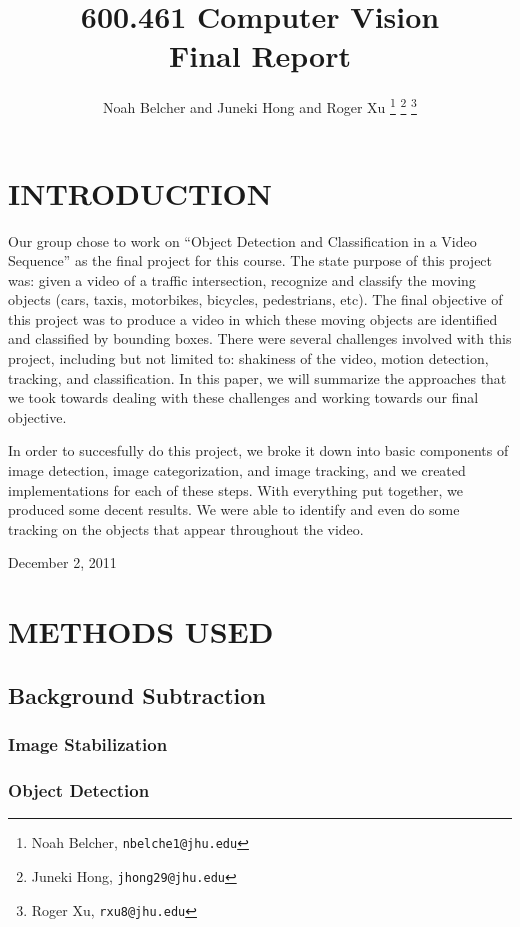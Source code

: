 \documentclass[a4paper, 10pt, conference]{ieeeconf}      %
\title{\LARGE \bf
600.461 Computer Vision\\Final Report
}
\author{Noah Belcher and Juneki Hong and Roger Xu%
\thanks{Noah Belcher,
        {\tt\small nbelche1@jhu.edu}}%
\thanks{Juneki Hong,
        {\tt\small jhong29@jhu.edu}}%
\thanks{Roger Xu,
		{\tt\small rxu8@jhu.edu}}%
}
\begin{document}
\maketitle
\thispagestyle{empty}
\pagestyle{empty}


\section{INTRODUCTION}

Our group chose to work on “Object Detection and Classification in a Video Sequence” as the final project for this course. The state purpose of this project was: given a video of a traffic intersection, recognize and classify the moving objects (cars, taxis, motorbikes, bicycles, pedestrians, etc). The final objective of this project was to produce a video in which these moving objects are identified and classified by bounding boxes. There were several challenges involved with this project, including but not limited to: shakiness of the video, motion detection, tracking, and classification. In this paper, we will summarize the approaches that we took towards dealing with these challenges and working towards our final objective. \newline


In order to succesfully do this project, we broke it down into basic components of image detection, image categorization, and image tracking, and we created implementations for each of these steps. With everything put together, we produced some decent results. We were able to identify and even do some tracking on the objects that appear throughout the video. 


\hfill December 2, 2011


\section{METHODS USED}

\subsection{Background Subtraction}

\subsubsection{Image Stabilization}

\subsubsection{Object Detection}
\end{document}
